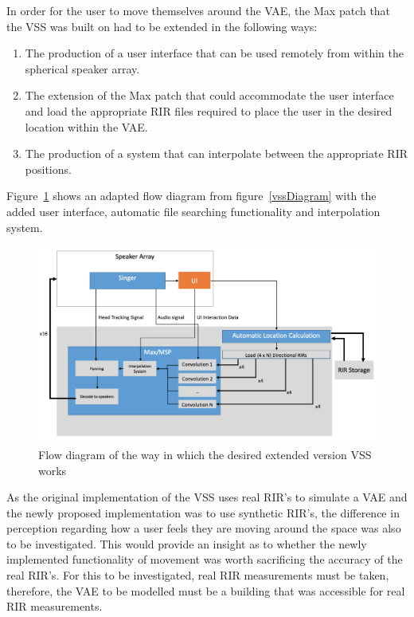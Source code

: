 \documentclass[../../main.tex]{subfiles}
\begin{document}
		In order for the user to move themselves around the \ac{VAE}, the Max patch that the \ac{VSS} was built on had to be extended in the following ways:

		\begin{enumerate}

			\item The production of a user interface that can be used remotely from within the spherical speaker array. \\

			\item The extension of the Max patch that could accommodate the user interface and load the appropriate \ac{RIR} files required to place the user in the desired location within the \ac{VAE}. \\

			\item The production of a system that can interpolate between the appropriate \ac{RIR} positions.

		\end{enumerate}

		Figure~\ref{vssExtention} shows an adapted flow diagram from figure~\ref{vssDiagram} with the added user interface, automatic file searching functionality and interpolation system.

		\begin{figure}
			\centerline{\includegraphics[width=\textwidth]{Sections/Background/images/vssExtention2.png}}
			\caption{Flow diagram of the way in which the desired extended version VSS works}
			\label{vssExtention}
		\end{figure}

		As the original implementation of the \ac{VSS} uses real \ac{RIR}'s to simulate a \ac{VAE} and the newly proposed implementation was to use synthetic \ac{RIR}'s, the difference in perception regarding how a user feels they are moving around the space was also to be investigated. This would provide an insight as to whether the newly implemented functionality of movement was worth sacrificing the accuracy of the real \ac{RIR}'s. For this to be investigated, real \ac{RIR} measurements must be taken, therefore, the \ac{VAE} to be modelled must be a building that was accessible for real \ac{RIR} measurements.
\end{document}

